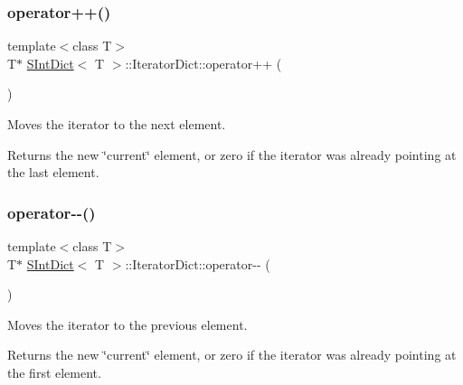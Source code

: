 \subsubsection{\texorpdfstring{operator++()}{operator++()}}
{\footnotesize\ttfamily template$<$class T$>$ \\
T$\ast$ \mbox{\hyperlink{class_s_int_dict}{S\+Int\+Dict}}$<$ T $>$\+::Iterator\+Dict\+::operator++ (\begin{DoxyParamCaption}{ }\end{DoxyParamCaption})\hspace{0.3cm}{\ttfamily [inline]}}

Moves the iterator to the next element. \begin{DoxyReturn}{Returns}
the new \char`\"{}current\char`\"{} element, or zero if the iterator was already pointing at the last element. 
\end{DoxyReturn}
\mbox{\label{class_s_int_dict_1_1_iterator_dict_aa68b38ab392a260b9a5b2c8b06f1b17b}} 
\subsubsection{\texorpdfstring{operator-\/-\/()}{operator--()}}
{\footnotesize\ttfamily template$<$class T$>$ \\
T$\ast$ \mbox{\hyperlink{class_s_int_dict}{S\+Int\+Dict}}$<$ T $>$\+::Iterator\+Dict\+::operator-\/-\/ (\begin{DoxyParamCaption}{ }\end{DoxyParamCaption})\hspace{0.3cm}{\ttfamily [inline]}}

Moves the iterator to the previous element. \begin{DoxyReturn}{Returns}
the new \char`\"{}current\char`\"{} element, or zero if the iterator was already pointing at the first element. 
\end{DoxyReturn}
\mbox{\label{class_s_int_dict_1_1_iterator_dict_a83a54bca4490af7eae48fedabde992fa}} 
